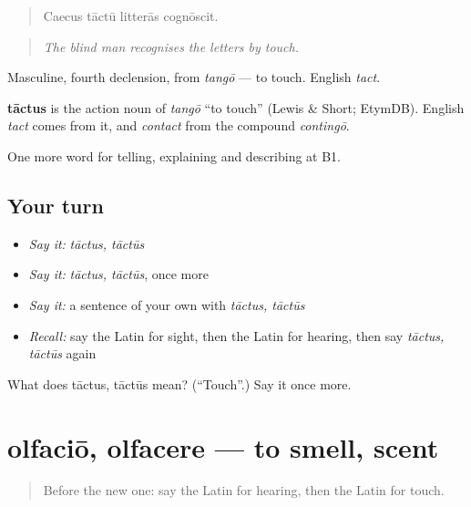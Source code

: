 \begin{quote}
Caecus tāctū litterās cognōscit.
\end{quote}

\begin{quote}
\emph{The blind man recognises the letters by touch.}
\end{quote}

Masculine, fourth declension, from \emph{tangō} — to touch. English \emph{tact}.

\begin{cousinweb}
\textbf{tāctus} is the action noun of \emph{tangō} \textquotedblleft{}to touch\textquotedblright{} (Lewis \& Short; EtymDB). English \emph{tact} comes from it, and \emph{contact} from the compound \emph{contingō}.
\end{cousinweb}

\begin{grammarlens}[title={What you've built}]
One more word for telling, explaining and describing at B1.
\end{grammarlens}

\subsection*{Your turn}
\begin{itemize}
\raggedright
  \item \emph{Say it:} \emph{tāctus, tāctūs}
  \item \emph{Say it:} \emph{tāctus, tāctūs}, once more
  \item \emph{Say it:} a sentence of your own with \emph{tāctus, tāctūs}
  \item \emph{Recall:} say the Latin for sight, then the Latin for hearing, then say \emph{tāctus, tāctūs} again
\end{itemize}

\begin{tcolorbox}[breakable,colback=teal!4,colframe=teal!35!black,title={Before you move on}]
What does tāctus, tāctūs mean? (\textquotedblleft{}Touch\textquotedblright{}.) Say it once more.
\end{tcolorbox}
\section[olfaciō, olfacere]{olfaciō, olfacere — to smell, scent}

\label{lesson:LA-C519-olfacio}



\begin{quote}
Before the new one: say the Latin for hearing, then the Latin for touch.
\end{quote}

